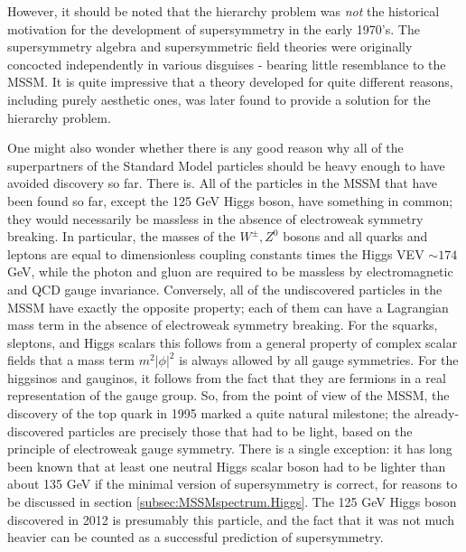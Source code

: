 \documentclass[12pt]{article}
\begin{document}
However, it should be noted that the hierarchy problem was {\it not} the 
historical motivation for the development of supersymmetry in the early 
1970's. The supersymmetry algebra and supersymmetric field theories were 
originally concocted independently in various disguises 
\cite{RNS}-\cite{Volkov} 
bearing little resemblance to the MSSM. It is quite impressive that a 
theory developed for quite different reasons, including purely aesthetic 
ones, was later found to provide a solution for the hierarchy problem.

One might also wonder whether there is any good reason why all of the
superpartners of the Standard Model particles should be heavy enough to
have avoided discovery so far. There is. All of the particles in the MSSM
that have been found so far, except the 125 GeV Higgs boson, 
have something in common; they would
necessarily be massless in the absence of electroweak symmetry breaking.
In particular, the masses of the $W^\pm, Z^0$ bosons and all quarks and
leptons are equal to dimensionless coupling constants times the Higgs VEV
$\sim 174 $ GeV, while the photon and gluon are required to be massless by
electromagnetic and QCD gauge invariance. Conversely, all of the
undiscovered particles in the MSSM have exactly the opposite property;
each of them can have a Lagrangian mass term in the absence of electroweak
symmetry breaking. For the squarks, sleptons, and Higgs scalars this
follows from a general property of complex scalar fields that a mass term
$m^2 |\phi|^2$ is always allowed by all gauge symmetries. For the
higgsinos and gauginos, it follows from the fact that they are fermions in
a real representation of the gauge group. So, from the point of view of
the MSSM, the discovery of the top quark in 1995 marked a quite natural
milestone; the already-discovered particles are precisely those that had
to be light, based on the principle of electroweak gauge symmetry. There
is a single exception: it has long been known that at least
one neutral Higgs scalar boson had to be lighter
than about 135 GeV if the minimal version of supersymmetry is correct, for
reasons to be discussed in section \ref{subsec:MSSMspectrum.Higgs}. 
The 125 GeV Higgs boson discovered in 2012 is presumably this particle, and the fact 
that it was not much heavier can be counted as a successful prediction of supersymmetry. 
\end{document}
